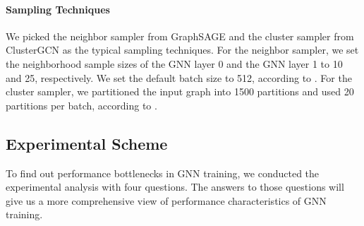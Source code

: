 \paragraph{Sampling Techniques}

We picked the neighbor sampler from GraphSAGE \cite{hamilton2017_graphsage} and the cluster sampler from ClusterGCN \cite{chiang2019_cluster_gcn} as the typical sampling techniques.
%
For the neighbor sampler, we set the neighborhood sample sizes of the GNN layer 0 and the GNN layer 1 to 10 and 25, respectively.
%
We set the default batch size to 512, according to \cite{hamilton2017_graphsage}.
%
For the cluster sampler, we partitioned the input graph into 1500 partitions and used 20 partitions per batch, according to \cite{chiang2019_cluster_gcn}.


\subsection{Experimental Scheme}
\label{sec:experimental_scheme}

To find out performance bottlenecks in GNN training, we conducted the experimental analysis with four questions.
%
The answers to those questions will give us a more comprehensive view of performance characteristics of GNN training.


